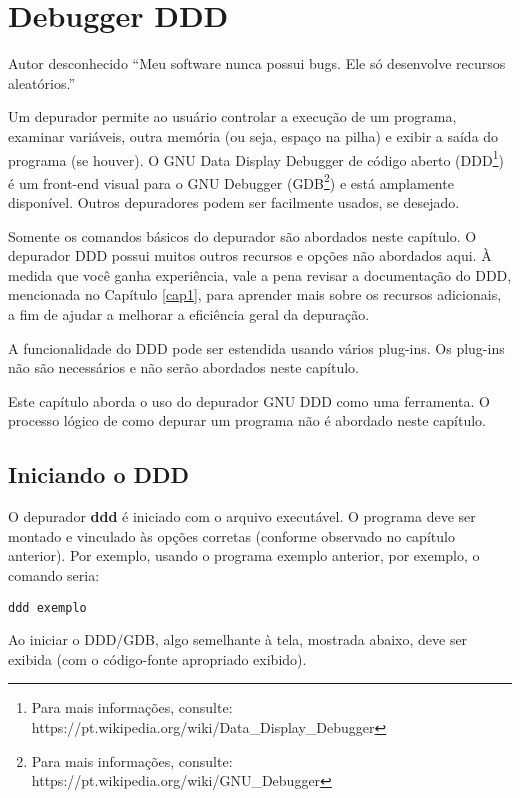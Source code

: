 \chapter{Debugger DDD}

\begin{chapquote}{Autor desconhecido}
``Meu software nunca possui bugs. Ele só
desenvolve recursos aleatórios.''
\end{chapquote}

Um depurador permite ao usuário controlar a execução de um programa, examinar variáveis, outra memória (ou seja, espaço na pilha) e exibir a saída do programa (se houver). O GNU Data Display Debugger de código aberto (DDD\footnote{Para mais informações, consulte: https://pt.wikipedia.org/wiki/Data\_Display\_Debugger}) é um front-end visual para o GNU Debugger (GDB\footnote{Para mais informações, consulte: https://pt.wikipedia.org/wiki/GNU\_Debugger}) e está amplamente disponível. Outros depuradores podem ser facilmente usados, se desejado.

Somente os comandos básicos do depurador são abordados neste capítulo. O depurador DDD possui muitos outros recursos e opções não abordados aqui. À medida que você ganha experiência, vale a pena revisar a documentação do DDD, mencionada no Capítulo \ref{cap1}, para aprender mais sobre os recursos adicionais, a fim de ajudar a melhorar a eficiência geral da depuração.

A funcionalidade do DDD pode ser estendida usando vários plug-ins. Os plug-ins não são necessários e não serão abordados neste capítulo.

Este capítulo aborda o uso do depurador GNU DDD como uma ferramenta. O processo lógico de como depurar um programa não é abordado neste capítulo.

\section{Iniciando o DDD}
O depurador \textbf{ddd} é iniciado com o arquivo executável. O programa deve ser montado e vinculado às opções corretas (conforme observado no capítulo anterior). Por exemplo, usando o programa exemplo anterior, por exemplo, o comando seria:
\begin{verbatim}
ddd exemplo
\end{verbatim}

Ao iniciar o DDD/GDB, algo semelhante à tela, mostrada abaixo, deve ser exibida (com o código-fonte apropriado exibido).